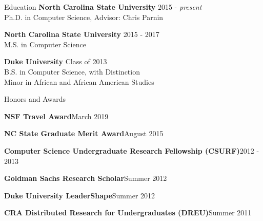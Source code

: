 \documentclass{resume} %
\begin{document}
\vspace{-12pt}
\begin{rSection}{Education}
\vspace{-4pt}
{\bf North Carolina State University} \hfill {2015 - \textit{present}} \\ 
Ph.D. in Computer Science, Advisor: Chris Parnin
\vspace{-7pt}

{\bf North Carolina State University} \hfill {2015 - 2017} \\ 
M.S. in Computer Science
\vspace{-7pt}

{\bf Duke University} \hfill {Class of 2013} \\ 
B.S. in Computer Science, with Distinction \\
Minor in African and African American Studies
\end{rSection}
\vspace{-12pt}
\begin{rSection}{Honors and Awards}
\vspace{-4pt}

\begin{sSubsection}
    {\textbf{NSF Travel Award}}{March 2019}
\end{sSubsection}
\vspace{-7pt}

\begin{sSubsection}
    {\textbf{NC State Graduate Merit Award}}{August 2015}
\end{sSubsection}
\vspace{-7pt}

\begin{sSubsection}
    {\textbf{Computer Science Undergraduate Research Fellowship (CSURF)}}{2012 - 2013}
\end{sSubsection}
\vspace{-7pt}

\begin{sSubsection}
    {\textbf{Goldman Sachs Research Scholar}}{Summer 2012}
\end{sSubsection}
\vspace{-7pt}

\begin{sSubsection}
    {\textbf{Duke University LeaderShape}}{Summer 2012}
\end{sSubsection}
\vspace{-7pt}

\begin{sSubsection}
    {\textbf{CRA Distributed Research for Undergraduates (DREU)}}{Summer 2011}
\end{sSubsection}
\end{rSection}
\vspace{-12pt}
\end{document}
